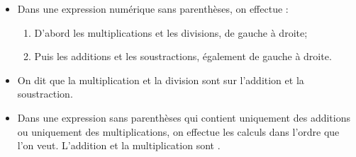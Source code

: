 \documentclass[12pt,a4paper]{article}
\begin{document}
\begin{myprops}
	\begin{itemize}
		
		\item Dans une expression numérique sans parenthèses, on effectue :
			\begin{enumerate}
				\item D'abord les multiplications et les divisions, de gauche à droite;
				\item Puis les additions et les soustractions, également de gauche à droite.
			\end{enumerate}		
		
		\item On dit que la multiplication et la division sont  sur l'addition et la soustraction. 
		
		\item Dans une expression sans parenthèses qui contient uniquement des additions ou uniquement des multiplications, on effectue les calculs dans l'ordre que l'on veut. L'addition et la multiplication sont .
		
	\end{itemize}
\end{myprops}
\end{document}
